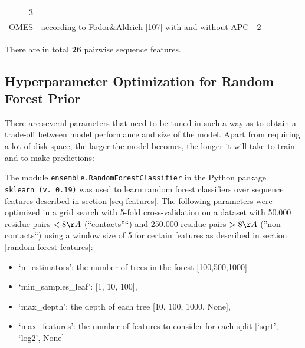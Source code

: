 \documentclass[12pt,a4paper,twoside]{book}
\providecommand{\tightlist}{%
  \setlength{\itemsep}{0pt}\setlength{\parskip}{0pt}}
\theoremstyle{definition}
\theoremstyle{definition}
\theoremstyle{remark}
\begin{document}
\begin{longtable}[]{@{}rlc@{}}
\begin{minipage}[t]{0.18\columnwidth}
3\strut
\end{minipage}\tabularnewline
\begin{minipage}[t]{0.23\columnwidth}\raggedleft\strut
OMES\strut
\end{minipage} & \begin{minipage}[t]{0.50\columnwidth}\raggedright\strut
according to Fodor\&Aldrich
{[}\protect\hyperlink{ref-Fodor2004a}{107}{]} with and without APC\strut
\end{minipage} & \begin{minipage}[t]{0.18\columnwidth}\centering\strut
2\strut
\end{minipage}\tabularnewline
\bottomrule
\end{longtable}

There are in total \textbf{26} pairwise sequence features.

\subsection{Hyperparameter Optimization for Random Forest
Prior}\label{hyperparameter-optimization-for-random-forest-prior}

There are several parameters that need to be tuned in such a way as to
obtain a trade-off between model performance and size of the model.
Apart from requiring a lot of disk space, the larger the model becomes,
the longer it will take to train and to make predictions:

The module \texttt{ensemble.RandomForestClassifier} in the Python
package \texttt{sklearn\ (v.\ 0.19)} was used to learn random forest
classifiers over sequence features described in section
\ref{seq-features}. The following parameters were optimized in a grid
search with 5-fold cross-validation on a dataset with 50.000 residue
pairs \(< 8 \AA\) (``contacts''``) and 250.000 residue pairs \(> 8 \AA\)
(''non-contacts``) using a window size of 5 for certain features as
described in section \ref{random-forest-features}:

\begin{itemize}
\tightlist
\item
  `n\_estimators': the number of trees in the forest {[}100,500,1000{]}
\item
  `min\_samples\_leaf': {[}1, 10, 100{]},
\item
  `max\_depth': the depth of each tree {[}10, 100, 1000, None{]},
\item
  `max\_features': the number of features to consider for each split
  {[}`sqrt', `log2', None{]}
\end{itemize}
\end{document}
